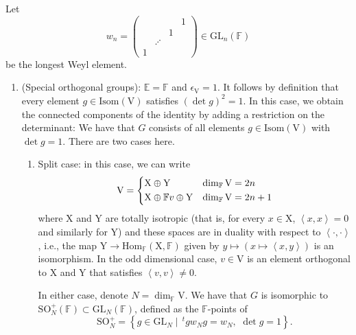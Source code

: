 \documentclass[12pt, reqno]{amsart}
\theoremstyle{definition}
\theoremstyle{definition}
\theoremstyle{definition}
\newcommand{\Hom}{\mathrm{Hom}}
\newcommand{\hermitianSpace}{\mathrm{V}}
\newcommand{\xIsotropic}{\mathrm{X}}
\newcommand{\yIsotropic}{\mathrm{Y}}
\newcommand{\innerproduct}[2]{\left\langle #1,#2\right\rangle}
\newcommand{\transpose}[1]{\, {}^{t}#1}
\newcommand{\GL}{\mathrm{GL}}
\newcommand{\SO}{\mathrm{SO}}
\newcommand{\finiteField}{\mathbb{F}}
\newcommand{\quadraticExtension}{\mathbb{E}}
\newcommand{\IsometryGroup}{\mathrm{Isom}}
\newcommand{\algebraicGroup}[1]{\boldsymbol{\mathrm{#1}}}
\begin{document}
Let $$w_n = \begin{pmatrix}
	& & & 1\\
	& & 1\\
	& \iddots\\
	1
\end{pmatrix} \in \GL_n\left(\finiteField\right)$$ be the longest Weyl element.
\begin{enumerate}
	\item (Special orthogonal groups): $\quadraticExtension = \finiteField$ and $\epsilon_{\hermitianSpace} = 1$. It follows by definition that every element $g \in \IsometryGroup\left(\hermitianSpace\right)$ satisfies $\left(\det g\right)^2 = 1$.  In this case, we obtain the connected components of the identity by adding a restriction on the determinant: We have that $G$ consists of all elements $g \in \IsometryGroup\left(\hermitianSpace\right)$ with $\det g = 1$. There are two cases here.
	\begin{enumerate}
		\item Split case: in this case, we can write $$\hermitianSpace = \begin{dcases}
		\xIsotropic \oplus \yIsotropic & \dim_{\finiteField} \hermitianSpace = 2n\\
		\xIsotropic \oplus \finiteField v \oplus \yIsotropic & \dim_{\finiteField}\hermitianSpace = 2n + 1
		\end{dcases}$$ where $\xIsotropic$ and $\yIsotropic$ are totally isotropic (that is, for every $x \in \xIsotropic$, $\innerproduct{x}{x} = 0$ and similarly for $\yIsotropic$) and these spaces are in duality with respect to $\innerproduct{\cdot}{\cdot}$, i.e., the map $\yIsotropic \to \Hom_{\finiteField}\left(\xIsotropic, \finiteField\right)$ given by $y \mapsto \left(x \mapsto \innerproduct{x}{y}\right)$ is an isomorphism. In the odd dimensional case, $v \in \hermitianSpace$ is an element orthogonal to $\xIsotropic$ and $\yIsotropic$ that satisfies $\innerproduct{v}{v} \ne 0$.
		
		In either case, denote $N = \dim_{\finiteField} \hermitianSpace$. We have that $G$ is isomorphic to $\SO^{+}_{N}\left(\finiteField\right) \subset  \GL_{N}\left(\finiteField\right)$, defined as the $\finiteField$-points of $$\algebraicGroup{\SO}^{+}_{N} = \left\{g \in \algebraicGroup{\GL}_{N} \mid \transpose{g} w_{N} g  = w_{N},\,\, \det g = 1\right\}.$$
		

\end{enumerate}
\end{enumerate}
\end{document}

